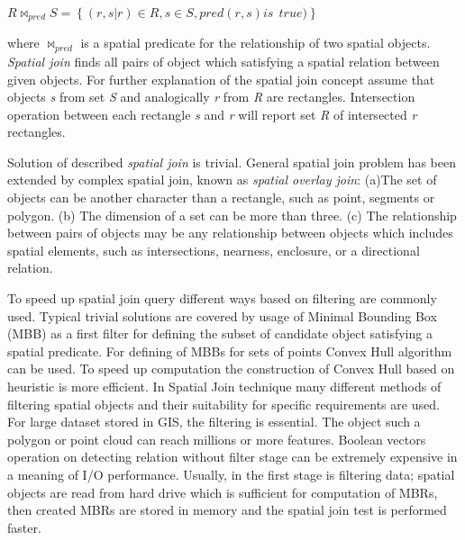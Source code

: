 \documentclass[a4paper,12pt,oneside]{report}
\begin{document}
\begin{center}
$R\bowtie_{pred}S=\left \{ \left ( r,s|r  \right )\in R,s \in S, pred(r,s) is \ \ true) \right \}  $
\end{center}
where $\bowtie_{pred}$ is a spatial predicate for the relationship of two
spatial objects. 
\linebreak 
\textit{Spatial join} finds all pairs of object which satisfying a spatial relation between given objects. 
For further explanation of the spatial join concept assume that  objects \emph{s} from set \emph{S} and 
analogically  \emph{r} from \emph{R} are rectangles. Intersection operation between each rectangle \emph{s} 
and \emph{r} will report set \emph{R} of intersected \emph{r} rectangles.

Solution of described \textit{spatial join} is trivial. General spatial join problem has been extended by 
complex spatial join, known as \textit{spatial overlay join}\cite{spatial_join}: (a)The set of objects
can be another character than a rectangle, such as point, segments or polygon. (b) The dimension of a set 
can be more than three. (c) The relationship between pairs of objects may be any relationship between 
objects which includes spatial elements, such as intersections, nearness, enclosure, or a directional relation. 

To speed up spatial join query different ways based on filtering are commonly used.
Typical trivial solutions are covered by usage of Minimal Bounding Box (MBB) as a first 
filter for defining the subset of candidate object satisfying a spatial predicate. For defining of MBBs for 
sets of points Convex Hull algorithm can be used. 
To speed up computation the construction of Convex Hull based on heuristic \cite{covex_hull} is more efficient. 
In Spatial Join technique \cite{spatial_join} 
many different methods of filtering spatial objects and their suitability for specific 
requirements are used. For large dataset stored in GIS, the filtering is essential. The object such a polygon 
or point cloud can reach millions or more features. Boolean vectors operation on detecting relation without filter stage 
can be extremely expensive in a meaning of I/O performance. Usually, in the first stage is filtering data; spatial objects 
are read from hard drive which is sufficient for computation of MBRs, then created MBRs are 
stored in memory and the spatial join test is performed faster.
\end{document}
